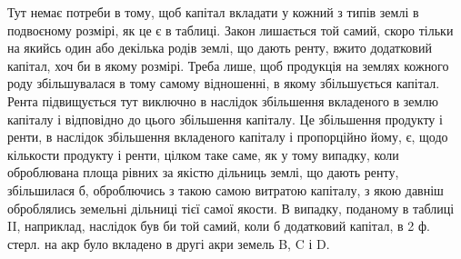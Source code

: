 Тут немає потреби в тому, щоб капітал вкладати у кожний з типів землі
в подвоєному розмірі, як це є в таблиці. Закон лишається той самий, скоро
тільки на якийсь один або декілька родів землі, що дають ренту, вжито додатковий капітал, хоч би в
якому розмірі. Треба лише, щоб продукція на землях
кожного роду збільшувалася в тому самому відношенні, в якому збільшується
капітал. Рента підвищується тут виключно в наслідок збільшення вкладеного
в землю капіталу і відповідно до цього збільшення капіталу. Це збільшення
продукту і ренти, в наслідок збільшення вкладеного капіталу і пропорційно
йому, є,  щодо кількости продукту і ренти, цілком таке саме, як у тому випадку,
коли оброблювана площа рівних за якістю дільниць землі, що дають ренту,
збільшилася б, оброблючись з такою самою витратою капіталу, з якою давніш оброблялись земельні
дільниці тієї самої якости. В випадку, поданому в таблиці II, наприклад, наслідок був би той самий,
коли б додатковий капітал,
в 2 ф. стерл. на акр було вкладено в другі акри земель B, C і D.
